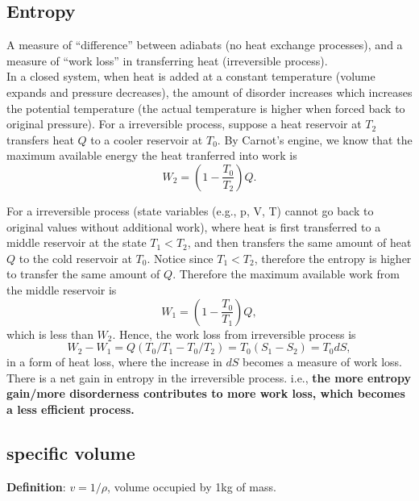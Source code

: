 \subsection{Entropy}
A measure of ``difference'' between adiabats (no heat exchange processes), and a measure of ``work
loss'' in transferring heat (irreversible process). \\

In a closed system, when heat is added at a constant temperature (volume expands and pressure
decreases), the amount of disorder increases which increases the potential temperature (the actual
temperature is higher when forced back to original pressure). For a irreversible process, suppose a
heat reservoir at $T_2$ transfers heat $Q$ to a cooler reservoir at $T_0$. By Carnot's engine, we
know that the maximum available energy the heat tranferred into work is
\begin{equation}
    W_2 = (1-\frac{T_0}{T_2})Q.
\end{equation}

For a irreversible process (state variables (e.g., p, V, T) cannot go back to original values
without additional work), where heat is first transferred to a middle reservoir at the state $T_1 <
T_2$, and then transfers the same amount of heat $Q$ to the cold reservoir at $T_0$.
Notice since $T_1 < T_2$, therefore the entropy is higher to transfer the same amount of $Q$.
Therefore the maximum available work from the middle reservoir is
\begin{equation}
    W_1 = (1-\frac{T_0}{T_1})Q,
\end{equation}
which is less than $W_2$. Hence, the work loss from irreversible process is 
\begin{equation}
    W_2-W_1 = Q(T_0/T_1 - T_0/T_2) = T_0(S_1 - S_2) = T_0 dS,
\end{equation} 
in a form of heat loss, where the increase in $dS$ becomes a measure of work loss. 
There is a net gain in entropy in the irreversible process.
i.e., {\bf the more entropy gain/more disorderness contributes to more work loss, which becomes a
less efficient process.}

\subsection{specific volume}
{\bf Definition}: $v = 1/\rho$, volume occupied by 1kg of mass.

